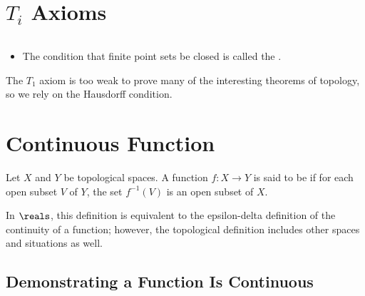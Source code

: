 \newpage

\section{$T_i$ Axioms}\label{ti axioms}

\begin{definition}[$T_i$ Axioms]
	$ $
	\begin{itemize}
		\item The condition that finite point sets be closed is 
		called the .
	\end{itemize}
\end{definition}

The $T_1$ axiom is too weak to prove many of the interesting 
theorems of topology, so we rely on the Hausdorff condition.


\newpage

\section{Continuous Function}\label{cont f sect}

\begin{definition}
	Let $X$ and $Y$ be topological spaces. A function $f:X \to Y$ 
	is said to be  if for each open subset $V$ of 
	$Y$, the set $f^{-1}(V)$ is an open subset of $X$.
\end{definition}

In $\reals$, this definition is equivalent to the epsilon-delta 
definition of the continuity of a function; however, the 
topological definition includes other spaces and situations as 
well.


\subsection{Demonstrating a Function Is Continuous}

